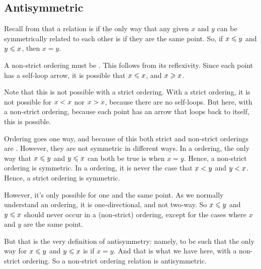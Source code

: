 \documentclass[../../../main.tex]{subfiles}
\begin{document}
\subsection{Antisymmetric}

\begin{aside}
  \begin{remark}
    Recall from  that a relation is  if the only way that any given $x$ and $y$ can be symmetrically related to each other is if they are the same point. So, if $x \order/ y$ and $y \order/ x$, then $x = y$.
  \end{remark}
\end{aside}

A non-strict ordering must be . This follows from its reflexivity. Since each point has a self-loop arrow, it is possible that $x \order/ x$, and $x \orderrev/ x$. 

Note that this is not possible with a strict ordering. With a strict ordering, it is not possible for $x \strictorder/ x$ nor $x \strictorderrev/ x$, because there are no self-loops.  But here, with a non-strict ordering, because each point has an arrow that loops back to itself, this is possible.

\begin{aside}
  \begin{remark}
    Ordering goes one way, and because of this both strict and non-strict orderings are . However, they are not symmetric in different ways. In a  ordering, the only way that $x \order/ y$ and $y \order/ x$ can both be true is when $x = y$. Hence, a non-strict ordering is symmetric. In a  ordering, it is never the case that $x \strictorder/ y$ and $y \strictorder/ x$. Hence, a strict ordering is symmetric.
  \end{remark}
\end{aside}

However, it's only possible for one and the same point. As we normally understand an ordering, it is one-directional, and not two-way. So $x \order/ y$ and $y \order/ x$ should never occur in a (non-strict) ordering, except for the cases where $x$ and $y$ are the same point.

But that is the very definition of antisymmetry: namely, to be such that the only way for $x \order/ y$ and $y \order/ x$ is if $x = y$. And that is what we have here, with a non-strict ordering. So a non-strict ordering relation is antisymmetric.
\end{document}

